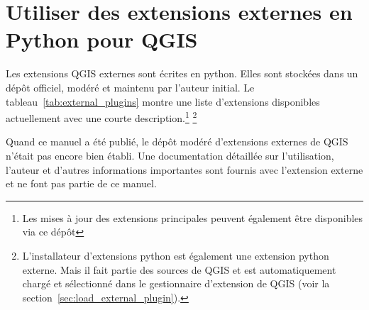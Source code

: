 \section{Utiliser des extensions externes en Python pour QGIS}\label{sec:external_plugins}


Les extensions QGIS externes sont \'ecrites en python. Elles sont stock\'ees dans un d\'ep\^ot
officiel, mod\'er\'e et maintenu par l'auteur initial. Le
tableau~\ref{tab:external_plugins} montre une liste d'extensions disponibles
actuellement avec une courte description.\footnote{Les mises \`a jour des extensions 
principales peuvent \'egalement \^etre disponibles via ce d\'ep\^ot}
\footnote{L'installateur d'extensions python est \'egalement une extension
python externe. Mais il fait partie des sources de QGIS et est automatiquement
charg\'e et s\'electionn\'e dans le gestionnaire d'extension de QGIS (voir la
section~\ref{sec:load_external_plugin}).}

Quand ce manuel a \'et\'e publi\'e, le d\'ep\^ot mod\'er\'e d'extensions externes de QGIS n'\'etait
pas encore bien \'etabli. Une documentation d\'etaill\'ee sur l'utilisation,
l'auteur et d'autres informations importantes sont fournis avec l'extension
externe et ne font pas partie de ce manuel.


